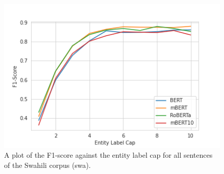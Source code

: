 \documentclass[11pt,a4paper]{article}
\begin{document}
\begin{figure}
    \centering
    \includegraphics[width=\columnwidth]{images/swa_models_plot.png}
    \caption{A plot of the F1-score against the entity label cap for all sentences of the Swahili corpus (swa).}
    \label{fig:swa_plot}
\end{figure}
\end{document}
